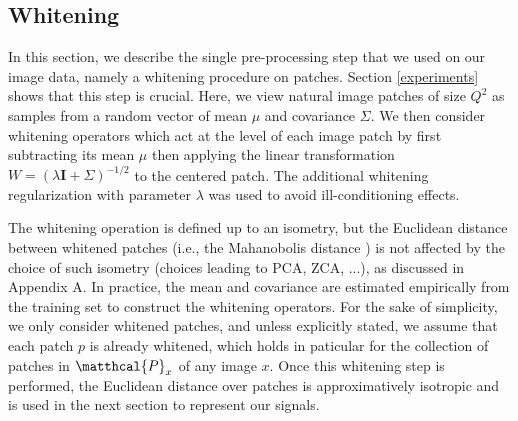 \documentclass{article} %
\begin{document}
\subsection{Whitening}

In this section, we describe the single pre-processing step that we used on our image data, namely a whitening procedure on patches. Section \ref{experiments} shows that this step is crucial. 
Here, we view  natural image patches of size $Q^2$ as samples from a random vector of mean $\mu$ and covariance   $\Sigma$. 
We then consider  whitening operators which act at the level of each image patch by first subtracting its mean $\mu$ then applying the linear transformation $W=(\lambda \mathbf{I}+\Sigma
)^{-1/2}$ to the centered patch. The additional whitening regularization with parameter $\lambda$ was used to avoid ill-conditioning effects.

The whitening operation is defined up to an isometry, but the Euclidean distance between whitened patches (i.e., the Mahanobolis distance \citep{chandra1936generalised}) is not affected by the choice of such isometry (choices leading to PCA, ZCA, ...), as discussed in Appendix A.
In practice,  the mean and covariance are estimated empirically from the training set to construct the whitening operators. For the sake of simplicity, we  only  consider whitened patches, and unless explicitly stated, we assume that each patch $p$ is already whitened, which holds in paticular for the collection of patches in $\matthcal{P}_x$ of any image $x$. 
Once this whitening step is performed, the Euclidean distance over patches is approximatively isotropic and is used in the next section to represent our signals.
\end{document}
